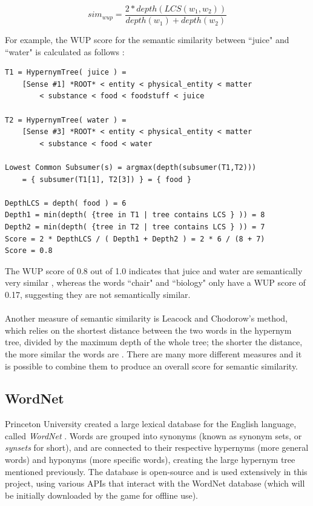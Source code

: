\documentclass[11pt]{article}
\begin{document}
$$sim_{wup} = \frac{2*depth(LCS(w_1,w_2))}{depth(w_1)+depth(w_2)}$$

For example, the WUP score for the semantic similarity between ``juice" and ``water" is calculated as follows \cite{RefWorks:49}:

\begin{lstlisting}[frame=single]
T1 = HypernymTree( juice ) =
    [Sense #1] *ROOT* < entity < physical_entity < matter
    	< substance < food < foodstuff < juice

T2 = HypernymTree( water ) =
    [Sense #3] *ROOT* < entity < physical_entity < matter
    	< substance < food < water

Lowest Common Subsumer(s) = argmax(depth(subsumer(T1,T2)))
    = { subsumer(T1[1], T2[3]) } = { food }

DepthLCS = depth( food ) = 6
Depth1 = min(depth( {tree in T1 | tree contains LCS } )) = 8
Depth2 = min(depth( {tree in T2 | tree contains LCS } )) = 7
Score = 2 * DepthLCS / ( Depth1 + Depth2 ) = 2 * 6 / (8 + 7)
Score = 0.8
\end{lstlisting}

The WUP score of 0.8 out of 1.0 indicates that juice and water are semantically very similar \cite{RefWorks:47}, whereas the words ``chair" and ``biology" only have a WUP score of 0.17, suggesting they are not semantically similar.
\\
\\
Another measure of semantic similarity is Leacock and Chodorow's method, which relies on the shortest distance between the two words in the hypernym tree, divided by the maximum depth of the whole tree; the shorter the distance, the more similar the words are \cite{RefWorks:46}. There are many more different measures and it is possible to combine them to produce an overall score for semantic similarity.

\subsection{WordNet}

Princeton University created a large lexical database for the English language, called \textit{WordNet} \cite{RefWorks:20}. Words are grouped into synonyms (known as synonym sets, or \textit{synsets} for short), and are connected to their respective hypernyms (more general words) and hyponyms (more specific words), creating the large hypernym tree mentioned previously. The database is open-source and is used extensively in this project, using various APIs that interact with the WordNet database (which will be initially downloaded by the game for offline use).
\end{document}
